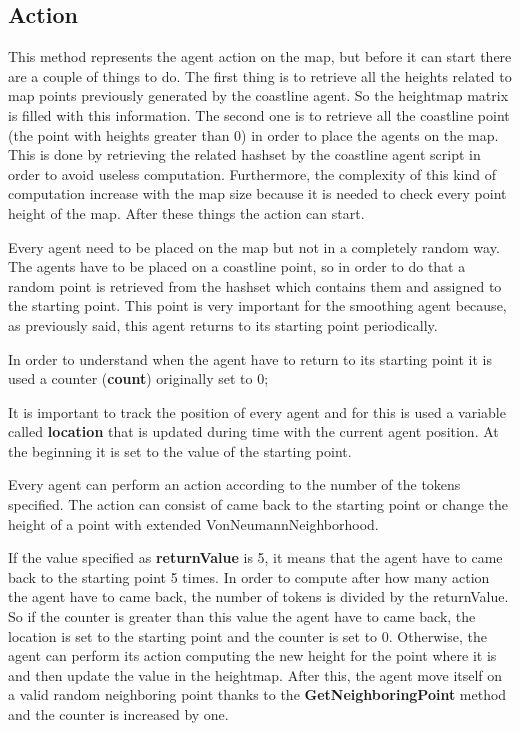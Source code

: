 \documentclass[12pt]{article}
\begin{document}
    \subsection{Action}
    This method represents the agent action on the map, but before it can start there are a couple of things to do.
    The first thing is to retrieve all the heights related to map points previously generated by the coastline agent. So the heightmap matrix is filled with this information.
    The second one is to retrieve all the coastline point (the point with heights greater than 0) in order to place the agents on the map. This is done by retrieving the
    related hashset by the coastline agent script in order to avoid useless computation. Furthermore, the complexity of this kind of computation increase with the map size 
    because it is needed to check every point height of the map.
    After these things the action can start.

    Every agent need to be placed on the map but not in a completely random way. The agents have to be placed on a coastline point, so in order to do that a random point is retrieved
    from the hashset which contains them and assigned to the starting point. This point is very important for the smoothing agent because, as previously said, this agent returns
    to its starting point periodically.

    In order to understand when the agent have to return to its starting point it is used a counter (\textbf{count}) originally set to 0;
    
    It is important to track the position of every agent and for this is used a variable called \textbf{location} that is updated during time with the current agent position. 
    At the beginning it is set to the value of the starting point.

    Every agent can perform an action according to the number of the tokens specified. The action can consist of came back to the starting point or change the height of a point
    with extended VonNeumannNeighborhood.

    If the value specified as \textbf{returnValue} is 5, it means that the agent have to came back to the starting point 5 times. In order to compute after how many action the agent
    have to came back, the number of tokens is divided by the returnValue. So if the counter is greater than this value the agent have to came back, the location is set to the
    starting point and the counter is set to 0. Otherwise, the agent can perform its action computing the new height for the point where it is and then update the value in the heightmap.
    After this, the agent move itself on a valid random neighboring point thanks to the \textbf{GetNeighboringPoint} method and the counter is increased by one.
\end{document}
